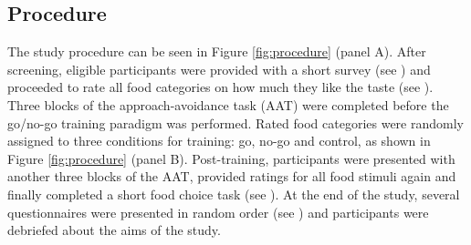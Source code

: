 \documentclass[man,floatsintext]{apa6}
\begin{document}
\hypertarget{procedure}{%
\subsection{Procedure}\label{procedure}}

The study procedure can be seen in Figure \ref{fig:procedure} (panel A). After screening, eligible participants were provided with a short survey (see \textit{}) and proceeded to rate all food categories on how much they like the taste (see \textit{}). Three blocks of the approach-avoidance task (AAT) were completed before the go/no-go training paradigm was performed. Rated food categories were randomly assigned to three conditions for training: go, no-go and control, as shown in Figure \ref{fig:procedure} (panel B). Post-training, participants were presented with another three blocks of the AAT, provided ratings for all food stimuli again and finally completed a short food choice task (see \textit{}). At the end of the study, several questionnaires were presented in random order (see \textit{}) and participants were debriefed about the aims of the study.
\end{document}
